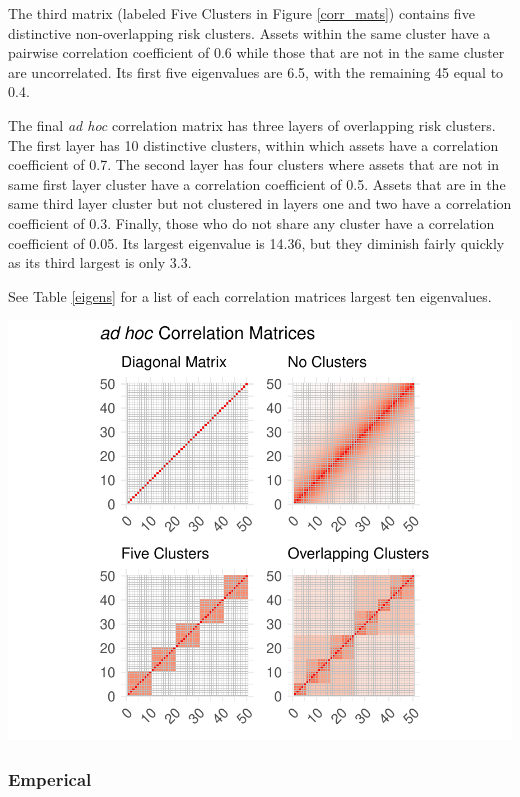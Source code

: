 \documentclass[11pt,preprint, authoryear]{elsarticle}
\let\origfigure\figure
\let\endorigfigure\endfigure
\renewenvironment{figure}[1][2] {
    \expandafter\origfigure\expandafter[H]
} {
    \endorigfigure
}
\numberwithin{equation}{section}
\numberwithin{figure}{section}
\numberwithin{table}{section}
\begin{document}
The third matrix (labeled Five Clusters in Figure \ref{corr_mats})
contains five distinctive non-overlapping risk clusters. Assets within
the same cluster have a pairwise correlation coefficient of 0.6 while
those that are not in the same cluster are uncorrelated. Its first five
eigenvalues are 6.5, with the remaining 45 equal to 0.4.

The final \emph{ad hoc} correlation matrix has three layers of
overlapping risk clusters. The first layer has 10 distinctive clusters,
within which assets have a correlation coefficient of 0.7. The second
layer has four clusters where assets that are not in same first layer
cluster have a correlation coefficient of 0.5. Assets that are in the
same third layer cluster but not clustered in layers one and two have a
correlation coefficient of 0.3. Finally, those who do not share any
cluster have a correlation coefficient of 0.05. Its largest eigenvalue
is 14.36, but they diminish fairly quickly as its third largest is only
3.3.

See Table \ref{eigens} for a list of each correlation matrices largest
ten eigenvalues.

\begin{figure}
\centering
\includegraphics{Thesis_files/figure-latex/corr mats-1.pdf}
\caption{\label{corr_mats} Correlation Matricies}
\end{figure}

\hypertarget{emperical}{%
\subsubsection{\texorpdfstring{Emperical
\label{emp}}{Emperical }}\label{emperical}}
\end{document}
